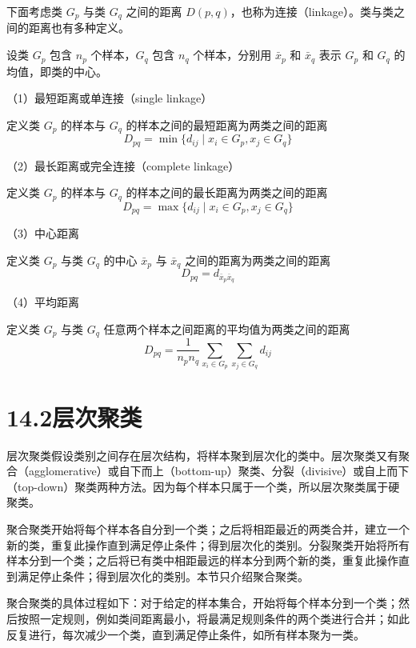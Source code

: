 \documentclass[UTF8, 12pt, fontset=fandol, oneside]{ctexart}
\begin{document}
下面考虑类 $G_p$ 与类 $G_q$ 之间的距离 $D(p,q)$，也称为连接（linkage）。类与类之间的距离也有多种定义。

设类 $G_p$ 包含 $n_p$ 个样本，$G_q$ 包含 $n_q$ 个样本，分别用 $\bar x_p$ 和 $\bar x_q$ 表示 $G_p$ 和 $G_q$ 的均值，即类的中心。

（1）最短距离或单连接（single linkage）

定义类 $G_p$ 的样本与 $G_q$ 的样本之间的最短距离为两类之间的距离
\begin{equation}
D_{pq}=\min\{d_{ij}\mid x_i\in G_p,x_j\in G_q\}
\tag{14.14}
\end{equation}

（2）最长距离或完全连接（complete linkage）

定义类 $G_p$ 的样本与 $G_q$ 的样本之间的最长距离为两类之间的距离
\begin{equation}
D_{pq}=\max\{d_{ij}\mid x_i\in G_p,x_j\in G_q\}
\tag{14.15}
\end{equation}

（3）中心距离

定义类 $G_p$ 与类 $G_q$ 的中心 $\bar x_p$ 与 $\bar x_q$ 之间的距离为两类之间的距离
\begin{equation}
D_{pq}=d_{\bar x_p\bar x_q}
\tag{14.16}
\end{equation}

（4）平均距离

定义类 $G_p$ 与类 $G_q$ 任意两个样本之间距离的平均值为两类之间的距离
\begin{equation}
D_{pq}=\frac{1}{n_pn_q}\sum_{x_i\in G_p}\sum_{x_j\in G_q}d_{ij}
\tag{14.17}
\end{equation}

\section*{14.2\quad 层次聚类}

层次聚类假设类别之间存在层次结构，将样本聚到层次化的类中。层次聚类又有聚合（agglomerative）或自下而上（bottom-up）聚类、分裂（divisive）或自上而下（top-down）聚类两种方法。因为每个样本只属于一个类，所以层次聚类属于硬聚类。

聚合聚类开始将每个样本各自分到一个类；之后将相距最近的两类合并，建立一个新的类，重复此操作直到满足停止条件；得到层次化的类别。分裂聚类开始将所有样本分到一个类；之后将已有类中相距最远的样本分到两个新的类，重复此操作直到满足停止条件；得到层次化的类别。本节只介绍聚合聚类。

聚合聚类的具体过程如下：对于给定的样本集合，开始将每个样本分到一个类；然后按照一定规则，例如类间距离最小，将最满足规则条件的两个类进行合并；如此反复进行，每次减少一个类，直到满足停止条件，如所有样本聚为一类。
\end{document}
